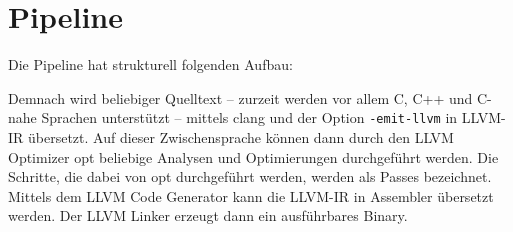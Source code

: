 \section{Pipeline \cite{IntroLLVM}}
Die Pipeline hat strukturell folgenden Aufbau:
\begin{comment}
    \begin{center}
        \smartdiagramset{
            back arrow disabled=true,
            uniform color list=blue!50!white for 5 items,
            additions={
                additional arrow tip=to,
                additional item shadow=drop shadow,
                additional item bottom color=blue!50!white
            }
        }
        \smartdiagramadd[flow diagram:horizontal]{
            C/C++/\\Obj-C/\dots,
            clang frontend,
            \ac{LLVM} Optimizer,
            \ac{LLVM} Code Generator
        }{
            below of module4/Linker,
            below of module3/Programm
        }
        \smartdiagramconnect{}{module4/additional-module1}
        \smartdiagramconnect{}{additional-module1/additional-module2}
    \end{center}
\end{comment}
\begin{center}
\end{center}
Demnach wird beliebiger Quelltext -- zurzeit werden vor allem C, C++ und C-nahe Sprachen unterstützt -- mittels clang und der Option \texttt{-emit-llvm} in \ac{LLVM-IR} übersetzt.
Auf dieser Zwischensprache können dann durch den \ac{LLVM} Optimizer opt beliebige Analysen und Optimierungen durchgeführt werden.
Die Schritte, die dabei von opt durchgeführt werden, werden als Passes bezeichnet.
Mittels dem \ac{LLVM} Code Generator kann die \ac{LLVM-IR} in Assembler übersetzt werden.
Der \ac{LLVM} Linker erzeugt dann ein ausführbares Binary.
